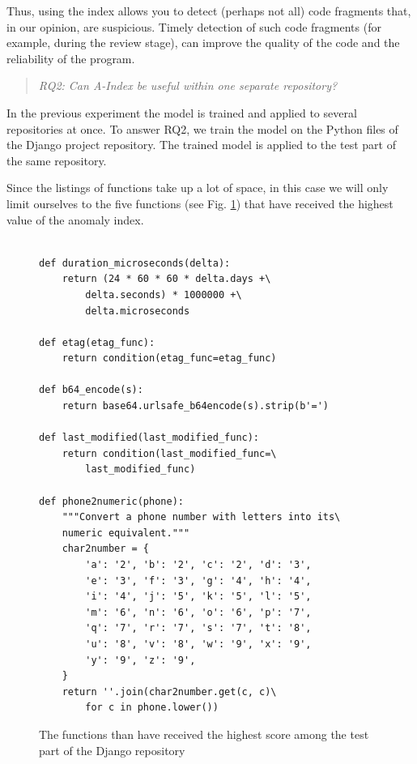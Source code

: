 \documentclass[10pt,conference]{IEEEtran}
\begin{document}
Thus, using the index allows you to detect (perhaps not all) code fragments that, in our opinion, are suspicious.
Timely detection of such code fragments (for example, during the review stage),
 can improve the quality of the code and the reliability of the program.

\bigskip


\begin{quote}\emph{RQ2: Can A-Index be useful within one separate repository?}\end{quote}

In the previous experiment the model is trained and applied to several repositories at once.
To answer RQ2, we train the model on the Python files of the Django project repository.
The trained model is applied to the test part of the same repository.

Since the listings of functions take up a lot of space,
 in this case we will only limit ourselves to the five functions (see Fig. \ref{five}) that have received the highest value of the anomaly index.

\begin{figure}%
\caption{The functions than have received the highest score among the test part of the Django repository}
\label{five}
\begin{verbatim}

def duration_microseconds(delta):
    return (24 * 60 * 60 * delta.days +\
        delta.seconds) * 1000000 +\
        delta.microseconds

def etag(etag_func):
    return condition(etag_func=etag_func)

def b64_encode(s):
    return base64.urlsafe_b64encode(s).strip(b'=')

def last_modified(last_modified_func):
    return condition(last_modified_func=\
        last_modified_func)

def phone2numeric(phone):
    """Convert a phone number with letters into its\
    numeric equivalent."""
    char2number = {
        'a': '2', 'b': '2', 'c': '2', 'd': '3',
        'e': '3', 'f': '3', 'g': '4', 'h': '4',
        'i': '4', 'j': '5', 'k': '5', 'l': '5',
        'm': '6', 'n': '6', 'o': '6', 'p': '7',
        'q': '7', 'r': '7', 's': '7', 't': '8',
        'u': '8', 'v': '8', 'w': '9', 'x': '9',
        'y': '9', 'z': '9',
    }
    return ''.join(char2number.get(c, c)\
        for c in phone.lower())
\end{verbatim}
\end{figure}
\end{document}
